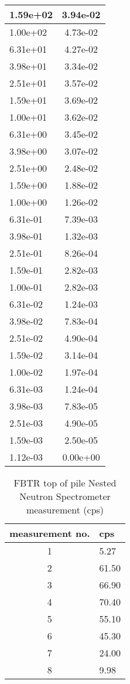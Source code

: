 \documentclass[review]{elsarticle}
\begin{document}
\begin{longtable}[h!]{|l|c|}
	1.59e+02&3.94e-02\\ \hline 
	1.00e+02&4.73e-02\\ \hline 
	6.31e+01&4.27e-02\\ \hline 
	3.98e+01&3.34e-02\\ \hline 
	2.51e+01&3.57e-02\\ \hline 
	1.59e+01&3.69e-02\\ \hline 
	1.00e+01&3.62e-02\\ \hline 
	6.31e+00&3.45e-02\\ \hline 
	3.98e+00&3.07e-02\\ \hline 
	2.51e+00&2.48e-02\\ \hline 
	1.59e+00&1.88e-02\\ \hline 
	1.00e+00&1.26e-02\\ \hline 
	6.31e-01&7.39e-03\\ \hline 
	3.98e-01&1.32e-03\\ \hline 
	2.51e-01&8.26e-04\\ \hline 
	1.59e-01&2.82e-03\\ \hline 
	1.00e-01&2.82e-03\\ \hline 
	6.31e-02&1.24e-03\\ \hline 
	3.98e-02&7.83e-04\\ \hline 
	2.51e-02&4.90e-04\\ \hline 
	1.59e-02&3.14e-04\\ \hline 
	1.00e-02&1.97e-04\\ \hline 
	6.31e-03&1.24e-04\\ \hline 
	3.98e-03&7.83e-05\\ \hline 
	2.51e-03&4.90e-05\\ \hline 
	1.59e-03&2.50e-05\\ \hline 
	1.12e-03&0.00e+00\\ \hline 
\end{longtable}


\begin{table}[h!]
		\centering
		\label{tab:fbtr-cps}
\caption{FBTR top of pile Nested Neutron Spectrometer measurement (cps)}
\begin{tabular}{|c|p{1cm}|}
\hline
measurement no. & cps  \\ \hline
1&	5.27\\  \hline
2&	61.50\\   \hline
3&	66.90\\   \hline
4&	70.40\\  \hline
5&	55.10\\  \hline
6&	45.30\\  \hline
7&	24.00\\  \hline
8&	9.98 \\  \hline
\end{tabular}
\end{table}
\end{document}
